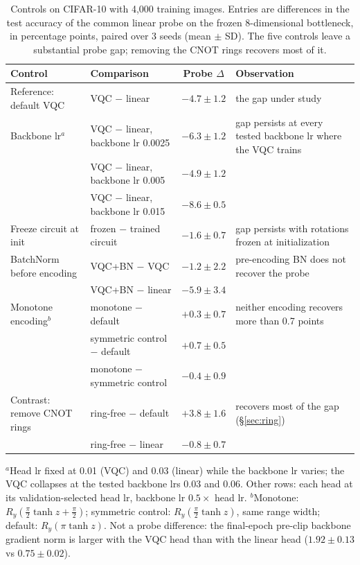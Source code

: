 \begin{table}[t]
\centering
\caption{Controls on CIFAR-10 with 4,000 training images. Entries are differences in the test
accuracy of the common linear probe on the frozen 8-dimensional bottleneck, in percentage
points, paired over 3 seeds (mean $\pm$ SD). The five controls leave a substantial probe gap;
removing the CNOT rings recovers most of it.}
\label{tab:controls}
\small
\setlength{\tabcolsep}{3pt}
\begin{tabular}{>{\raggedright\arraybackslash}p{2.8cm}>{\raggedright\arraybackslash}p{4.2cm}c>{\raggedright\arraybackslash}p{4.4cm}}
\toprule
Control & Comparison & Probe $\Delta$ & Observation \\
\midrule
Reference: default VQC & VQC $-$ linear & $-4.7 \pm 1.2$ & the gap under study \\
\midrule
Backbone lr$^a$ & VQC $-$ linear, backbone lr 0.0025 & $-6.3 \pm 1.2$ & gap persists at every tested backbone lr where the VQC trains \\
 & VQC $-$ linear, backbone lr 0.005 & $-4.9 \pm 1.2$ &  \\
 & VQC $-$ linear, backbone lr 0.015 & $-8.6 \pm 0.5$ &  \\
Freeze circuit at init & frozen $-$ trained circuit & $-1.6 \pm 0.7$ & gap persists with rotations frozen at initialization \\
BatchNorm before encoding & VQC+BN $-$ VQC & $-1.2 \pm 2.2$ & pre-encoding BN does not recover the probe \\
 & VQC+BN $-$ linear & $-5.9 \pm 3.4$ &  \\
Monotone encoding$^b$ & monotone $-$ default & $+0.3 \pm 0.7$ & neither encoding recovers more than 0.7 points \\
 & symmetric control $-$ default & $+0.7 \pm 0.5$ &  \\
 & monotone $-$ symmetric control & $-0.4 \pm 0.9$ &  \\
\midrule
Contrast: remove CNOT rings & ring-free $-$ default & $+3.8 \pm 1.6$ & recovers most of the gap (\S\ref{sec:ring}) \\
 & ring-free $-$ linear & $-0.8 \pm 0.7$ &  \\
\bottomrule
\end{tabular}

\smallskip
\begin{minipage}{0.97\textwidth}\footnotesize $^a$Head lr fixed at 0.01 (VQC) and 0.03 (linear) while the backbone lr varies; the VQC collapses at the tested backbone lrs 0.03 and 0.06. Other rows: each head at its validation-selected head lr, backbone lr $0.5\times$ head lr. $^b$Monotone: $R_y(\frac{\pi}{2}\tanh z + \frac{\pi}{2})$; symmetric control: $R_y(\frac{\pi}{2}\tanh z)$, same range width; default: $R_y(\pi\tanh z)$. Not a probe difference: the final-epoch pre-clip backbone gradient norm is larger with the VQC head than with the linear head ($1.92 \pm 0.13$ vs $0.75 \pm 0.02$).\end{minipage}
\end{table}
